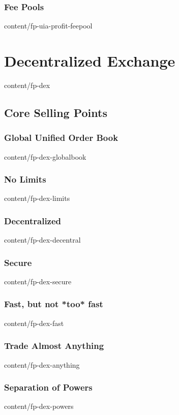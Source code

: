 \documentclass[conference,final,10pt,a4paper]{IEEEtran}
\begin{document}
\subsubsection { Fee Pools                                       }  { content/fp-uia-profit-feepool  } 

\section       { Decentralized Exchange                          }  { content/fp-dex                 } 
\subsection    { Core Selling Points                             } 
\subsubsection { Global Unified Order Book                       }  { content/fp-dex-globalbook      } 
\subsubsection { No Limits                                       }  { content/fp-dex-limits          } 
\subsubsection { Decentralized                                   }  { content/fp-dex-decentral       } 
\subsubsection { Secure                                          }  { content/fp-dex-secure          } 
\subsubsection { Fast, but not *too* fast                        }  { content/fp-dex-fast            } 
\subsubsection { Trade Almost Anything                           }  { content/fp-dex-anything        } 
\subsubsection { Separation of Powers                            }  { content/fp-dex-powers          } 
\end{document}
